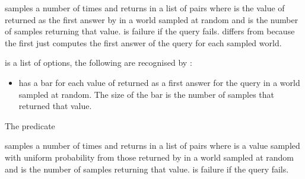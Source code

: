 \documentclass[letterpaper,10pt,english]{sphinxmanual}
\begin{document}
\sphinxAtStartPar
samples  a number of  times and returns in  a list of pairs  where  is the value of  returned as the first answer by  in a world sampled at random and  is the number of samples returning that value.  is failure if the query fails.  differs from  because the first just computes the first answer of the query for each sampled world.

\sphinxAtStartPar
{} is a list of options, the following are recognised by :
\begin{itemize}
\item {} 
\sphinxAtStartPar
{}  has a bar for each value of  returned as a first answer for the query in a world sampled at random. The size of the bar is the number of samples that returned that value.

\end{itemize}

\sphinxAtStartPar
The predicate

\begin{sphinxVerbatim}[commandchars=\\\{\}]
  
\end{sphinxVerbatim}

\sphinxAtStartPar
samples  a number of  times and returns in  a list of pairs  where  is a value sampled with uniform probability from those returned by  in a world sampled at random and  is the number of samples returning that value.
 is failure if the query fails.
\end{document}
